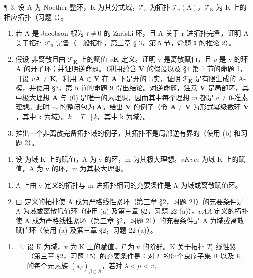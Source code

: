 ¶ 3. 设 A 为 Noether 整环，K 为其分式域，\(\mathcal{T}_{u}\) 为拓扑 \(\mathcal{T}_{u}(\mathrm{A})\)，\(\mathcal{T}_{\mathrm{K}}\) 为 K 上的相应拓扑（习题 1）。

\begin{enumerate}
\def\labelenumi{(\alph{enumi})}
\item
  若 A 是 Jacobson 根为 \(\mathfrak{r} \neq 0\) 的 Zariski 环，且 A 关于 r-进拓扑完备，证明 A 关于拓扑 \(\mathcal{T}_u\) 完备（一般拓扑，第三章 § 3，第 5 节，命题 9 的推论 2）。
\item
  假设  非离散且由 \(\mathcal{T}_{\mathbf{K}}\) 上的赋值 \(v\)\(\mathbf{K}\) 定义。证明 v 是离散赋值，且 \(v\) 是 v 的环 \(\mathbf{A}\) 的开子环；并证明逆命题。（利用蕴含 \(\mathbf{V}\) 的假设以及 §4 第 1 节的命题 1，可设 \(v\)\(\mathbf{A} \neq \mathbf{K}\)。利用 \(\mathbf{A} \subset \mathbf{V}\) 在 \(\mathbf{A}\) 下是开的事实，证明 \(\mathcal{T}_{\mathbf{K}}\) 是有限生成的 A-模，并使用 §3，第 5 节的命题 9 得出结论。对逆命题，注意 \(\mathbf{V}\) 是局部环，其中极大理想 \(\mathbf{A}\) 与 (0) 是唯一的素理想，因而其中每个理想 \(m\) 都是 \(a \neq 0\)-准素理想。此时 \(m\) 的整闭包为 \(\mathbf{A}\)。给出 \(\mathbf{V}\) 的例子（令 \(\mathbf{A} \neq \mathbf{V}\) 为形式幂级数环 \(\mathbf{V}\)，其中 k 为域）。\(k[[T]]\)\(k\)，其中 k 为域）。
\item
  推出一个非离散完备拓扑域的例子，其拓扑不是局部逆有界的（使用 (b) 和习题 2）。
\end{enumerate}

\begin{enumerate}
\def\labelenumi{\arabic{enumi}.}
\setcounter{enumi}{3}
\tightlist
\item
  设  为域 K 上的赋值，A 为 v 的环，m 为其极大理想。\(v\)\(K\)\(v\)\(m\) 为域 K 上的赋值，A 为 v 的环，m 为其极大理想。
\end{enumerate}

\begin{enumerate}
\def\labelenumi{(\alph{enumi})}
\item
  A 上由 v 定义的拓扑与 m-进拓扑相同的充要条件是 A 为域或离散赋值环。
\item
  由  定义的拓扑使 A 成为严格线性紧环（第三章 §2，习题 21）的充要条件是 A 为域或离散赋值环（使用 (a) 及第三章 §2，习题 22 (a)）。\(v\)\(A\)\(A\) 定义的拓扑使 A 成为严格线性紧环（第三章 §2，习题 21）的充要条件是 A 为域或离散赋值环（使用 (a) 及第三章 §2，习题 22 (a)）。
\end{enumerate}

\begin{enumerate}
\def\labelenumi{\arabic{enumi}.}
\setcounter{enumi}{4}
\tightlist
\item
  \begin{enumerate}
  \def\labelenumii{(\alph{enumii})}
  \tightlist
  \item
    设 K 为域，v 为 K 上的赋值，\(\Gamma\) 为 v 的阶群。K 关于拓扑 \(T_{v}\) 线性紧（第三章 §2，习题 15）的充要条件是：对 \(\Gamma\) 的每个良序子集 B 以及 K 的每个元素族 \((a_{\beta})_{\beta\in\mathcal{B}}\)，若对 \(\lambda<\mu<v\)，
  \end{enumerate}
\end{enumerate}

